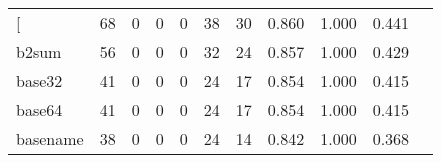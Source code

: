 \begin{longtable}{lp{1.2cm}p{1.2cm}p{1.2cm}p{1.2cm}p{1.2cm}p{1.2cm}p{1.2cm}p{1.2cm}p{1.2cm}p{1.2cm}}
\bottomrule
\endlastfoot
{[}         &                                    68 &                                                  0 &                                                  0 &                                                  0 &                                                 38 &                                                 30 &                                              0.860 &                                              1.000 &                                              0.441 \\
b2sum     &                                    56 &                                                  0 &                                                  0 &                                                  0 &                                                 32 &                                                 24 &                                              0.857 &                                              1.000 &                                              0.429 \\
base32    &                                    41 &                                                  0 &                                                  0 &                                                  0 &                                                 24 &                                                 17 &                                              0.854 &                                              1.000 &                                              0.415 \\
base64    &                                    41 &                                                  0 &                                                  0 &                                                  0 &                                                 24 &                                                 17 &                                              0.854 &                                              1.000 &                                              0.415 \\
basename  &                                    38 &                                                  0 &                                                  0 &                                                  0 &                                                 24 &                                                 14 &                                              0.842 &                                              1.000 &                                              0.368 \\

\end{longtable}
